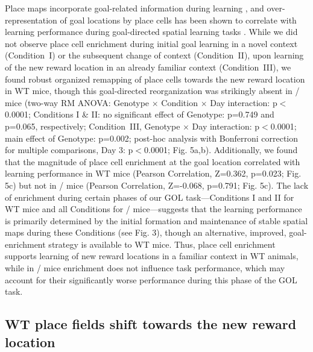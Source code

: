 Place maps incorporate goal-related information during learning \citep{Breese1989, Dupret2010b, Fyhn2002, Gothard1996, Hok2007, Hollup2001b, Kobayashi1997}, and over-representation of goal locations by place cells has been shown to correlate with learning performance during goal-directed spatial learning tasks \citep{Dupret2010a, Hollup2001b}.  While we did not observe place cell enrichment during initial goal learning in a novel context (Condition~I) or the subsequent change of context (Condition~II), upon learning of the new reward location in an already familiar context (Condition~III), we found robust organized remapping of place cells towards the new reward location in WT mice, though this goal-directed reorganization was strikingly absent in \df/ mice (two-way RM ANOVA: Genotype $\times$ Condition $\times$ Day interaction: p$<$0.0001; Conditions I \& II: no significant effect of Genotype:  p=0.749 and p=0.065, respectively; Condition~III, Genotype $\times$ Day interaction: p$<$0.0001; main effect of Genotype: p=0.002; post-hoc analysis with Bonferroni correction for multiple comparisons, Day 3: p$<$0.0001; Fig. 5a,b).  Additionally, we found that the magnitude of place cell enrichment at the goal location correlated with learning performance in WT mice (Pearson Correlation, Z=0.362, p=0.023; Fig. 5c) but not in \df/ mice (Pearson Correlation, Z=-0.068, p=0.791; Fig. 5c). The lack of enrichment during certain phases of our GOL task—Conditions I and II for WT mice and all Conditions for \df/ mice—suggests that the learning performance is primarily determined by the initial formation and maintenance of stable spatial maps during these Conditions (see Fig. 3), though an alternative, improved, goal-enrichment strategy is available to WT mice. Thus, place cell enrichment supports learning of new reward locations in a familiar context in WT animals, while in \df/ mice enrichment does not influence task performance, which may account for their significantly worse performance during this phase of the GOL task.

\subsection{WT place fields shift towards the new reward location}

